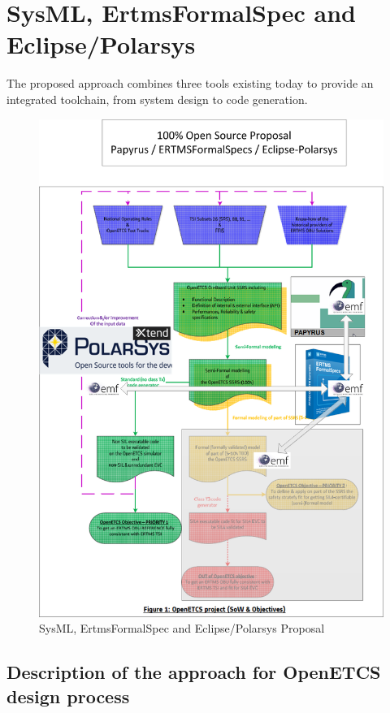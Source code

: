 \chapter{SysML, ErtmsFormalSpec and Eclipse/Polarsys}
\label{sec:sysML-EFS}

The proposed approach combines three tools existing today to provide an integrated toolchain, from system design 
to code generation.

\begin{figure}
	\centering
		\includegraphics[width=1.10\textwidth]{images/ERTMSSolutionsAlt_1.png}
		\caption{SysML, ErtmsFormalSpec and Eclipse/Polarsys Proposal}
	\label{fig:ERTMSSolutionsAlt_1}
\end{figure}

\section{Description of the approach for OpenETCS design process}


